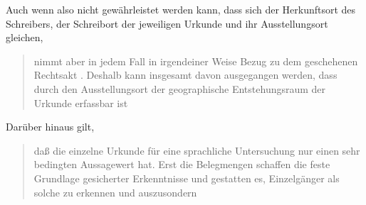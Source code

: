 Auch wenn also nicht gewährleistet werden kann, dass sich der Herkunftsort des
Schreibers, der Schreibort der jeweiligen Urkunde und ihr Ausstellungsort
gleichen, \blockcquote[331--332]{ganslmayeretal2003}{nimmt  aber in jedem Fall in irgendeiner Weise Bezug zu dem
geschehenen Rechtsakt \textelp{}. Deshalb kann insgesamt davon ausgegangen
werden, dass durch den Ausstellungsort der geographische Entstehungsraum der
Urkunde erfassbar ist}.
% 
Darüber hinaus gilt, \blockcquote[122]{deboor1974}{daß die einzelne Urkunde für
eine sprachliche Untersuchung nur einen sehr bedingten Aussagewert hat. Erst
die Belegmengen schaffen die feste Grundlage gesicherter Erkenntnisse und
gestatten es, Einzelgänger als solche zu erkennen und auszusondern}.

